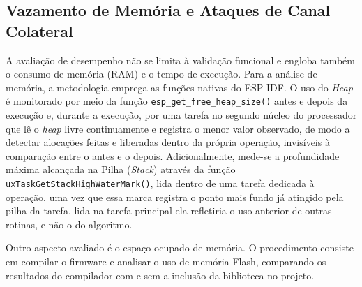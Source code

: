
\subsection{Vazamento de Memória e Ataques de Canal Colateral}
A avaliação de desempenho não se limita à validação funcional e engloba também o consumo de memória (RAM) e o tempo de execução. Para a análise de memória, a metodologia emprega as funções nativas do ESP-IDF. O uso do \textit{Heap} é monitorado por meio da função \texttt{esp\_get\_free\_heap\_size()} antes e depois da execução e, durante a execução, por uma tarefa no segundo núcleo do processador que lê o \textit{heap} livre continuamente e registra o menor valor observado, de modo a detectar alocações feitas e liberadas dentro da própria operação, invisíveis à comparação entre o antes e o depois. Adicionalmente, mede-se a profundidade máxima alcançada na Pilha (\textit{Stack}) através da função \texttt{uxTaskGetStackHighWaterMark()}, lida dentro de uma tarefa dedicada à operação, uma vez que essa marca registra o ponto mais fundo já atingido pela pilha da tarefa, lida na tarefa principal ela refletiria o uso anterior de outras rotinas, e não o do algoritmo.

Outro aspecto avaliado é o espaço ocupado de memória. O procedimento consiste em compilar o firmware e analisar o uso de memória Flash, comparando os resultados do compilador com e sem a inclusão da biblioteca no projeto.

